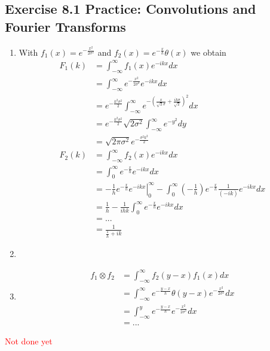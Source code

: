 \documentclass[../main.tex]{subfiles}
\begin{document}
\subsection{Exercise 8.1 Practice: Convolutions and Fourier Transforms}
\begin{enumerate}[label=(\alph*)]
\item With $f_1(x)=e^{-\frac{x^2}{2\sigma^2}}$ and $f_2(x)=e^{-\frac{x}{h}}\theta(x)$ we obtain
\begin{align}
    F_1(k)&=\int_{-\infty}^\infty f_1(x)e^{-ikx}dx\\
    &=\int_{-\infty}^\infty e^{-\frac{x^2}{2\sigma^2}}e^{-ikx}dx\\
    &=e^{-\frac{k^2\sigma^2}{2}}\int_{-\infty}^\infty e^{-\left(\frac{x}{\sqrt{2}\sigma}+\frac{ik\sigma}{\sqrt{2}}\right)^2}dx\\
    &=e^{-\frac{k^2\sigma^2}{2}} \sqrt{2\sigma^2} \int_{-\infty}^\infty e^{-y^2}dy\\
    &=\sqrt{2\pi\sigma^2}e^{-\frac{\sigma^2k^2}{2}}\\
    F_2(k)&=\int_{-\infty}^\infty f_2(x)e^{-ikx}dx\\
    &=\int_{0}^\infty e^{-\frac{x}{h}}e^{-ikx}dx\\
    &=-\frac{1}{h}\left.e^{-\frac{x}{h}}e^{-ikx}\right|_0^\infty -\int_{0}^\infty \left(-\frac{1}{h}\right)e^{-\frac{x}{h}}\frac{1}{(-ik)}e^{-ikx}dx\\
    &=\frac{1}{h} -\frac{1}{ihk}\int_{0}^\infty e^{-\frac{x}{h}}e^{-ikx}dx\\
    &= ...\\
    &=\frac{1}{\frac{1}{h}+ik}
\end{align}
\item
\item
\begin{align}
    f_1\otimes f_2
    &=\int_{-\infty}^\infty f_2(y-x)f_1(x)dx\\
    &=\int_{-\infty}^\infty e^{-\frac{y-x}{h}}\theta(y-x)e^{-\frac{x^2}{2\sigma^2}}dx\\
    &=\int_{-\infty}^y e^{-\frac{y-x}{h}}e^{-\frac{x^2}{2\sigma^2}}dx\\
    &=...
\end{align}
\end{enumerate}
\textcolor{red}{Not done yet}
\end{document}
